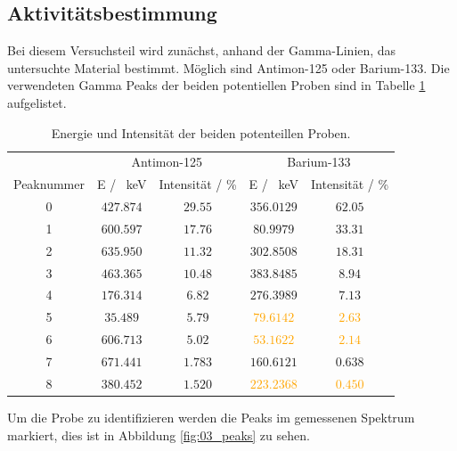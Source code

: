 \subsection{Aktivitätsbestimmung}
Bei diesem Versuchsteil wird zunächst, anhand der Gamma-Linien, das untersuchte Material bestimmt.
Möglich sind Antimon-125 oder Barium-133.
Die verwendeten Gamma Peaks der beiden potentiellen Proben sind in Tabelle \ref{tab:Ba_133Sb_125} aufgelistet.
\FloatBarrier
\begin{table}
  \centering
  \caption{Energie und Intensität der beiden potenteillen Proben.}
  \label{tab:Ba_133Sb_125}
  \begin{tabular}{c c c c c}
    \toprule
    & \multicolumn{2}{c}{Antimon-125} & \multicolumn{2}{c}{Barium-133} \\
    \cmidrule(lr){2-3}\cmidrule(lr){4-5}
    Peaknummer & E / \SI{}{\kilo\eV} & Intensität / \%& E / \SI{}{\kilo\eV} & Intensität / \%\\
    \midrule
    0&$\num{427.874}$&$\num{29.55}$&$\num{356.0129}$&$\num{62.05}$\\
    1&$\num{600.597}$&$\num{17.76}$&$\num{80.9979}$&$\num{33.31}$\\
    2&$\num{635.950}$&$\num{11.32}$&$\num{302.8508}$&$\num{18.31}$\\
    3&$\num{463.365}$&$\num{10.48}$&$\num{383.8485}$&$\num{8.94}$\\
    4&$\num{176.314}$&$\num{6.82}$ &$\num{276.3989}$&$\num{7.13}$\\
    5&$\num{35.489}$&$\num{5.79}$  &\textcolor{orange}{$\num{79.6142}$}&\textcolor{orange}{$\num{2.63}$}\\
    6&$\num{606.713}$&$\num{5.02}$ &\textcolor{orange}{$\num{53.1622}$}&\textcolor{orange}{$\num{2.14}$}\\
    7&$\num{671.441}$&$\num{1.783}$&$\num{160.6121}$&$\num{0.638}$\\
    8&$\num{380.452}$&$\num{1.520}$&\textcolor{orange}{$\num{223.2368}$}&\textcolor{orange}{$\num{0.450}$}\\
    \bottomrule
  \end{tabular}
\end{table}
\FloatBarrier
Um die Probe zu identifizieren werden die Peaks im gemessenen Spektrum markiert, dies ist in Abbildung \ref{fig:03_peaks} zu sehen.
\FloatBarrier
